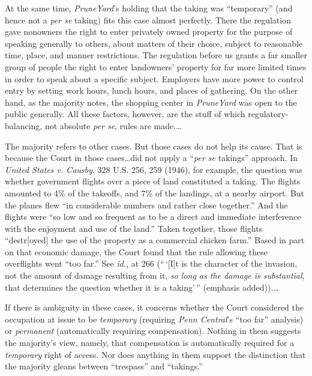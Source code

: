 At the same time, \textit{PruneYard}'s holding that the taking was ``temporary''
(and hence not a \textit{per se} taking) fits this case almost perfectly. There
the regulation gave nonowners the right to enter privately owned property for
the purpose of speaking generally to others, about matters of their choice,
subject to reasonable time, place, and manner restrictions. The regulation
before us grants a far smaller group of people the right to enter landowners'
property for far more limited times in order to speak about a specific subject.
Employers have more power to control entry by setting work hours, lunch hours,
and places of gathering. On the other hand, as the majority notes, the shopping
center in \textit{PruneYard} was open to the public generally. All these
factors, however, are the stuff of which regulatory-balancing, not absolute
\textit{per se}, rules are made.\ldots


The majority refers to other cases. But those cases do not help its cause. That
is because the Court in those cases\ldots did not apply a ``\textit{per se}
takings'' approach. In \textit{United States v. Causby}, 328 U.S. 256, 259
(1946), for example, the question was whether government flights over a piece of
land constituted a taking. The flights amounted to 4\% of the takeoffs, and 7\%
of the landings, at a nearby airport. But the planes flew ``in considerable
numbers and rather close together.'' And the flights were ``so low and so
frequent as to be a direct and immediate interference with the enjoyment and use
of the land.'' Taken together, those flights ``destr[oyed] the use of the
property as a commercial chicken farm.'' Based in part on that economic damage,
the Court found that the rule allowing these overflights went ``too far.'' See
\textit{id.}, at 266 (``\,`[I]t is the character of the invasion, not the amount
of damage resulting from it, \textit{so long as the damage is substantial}, that
determines the question whether it is a taking'\,'' (emphasis added)).\ldots


If there is ambiguity in these cases, it concerns whether the Court considered
the occupation at issue to be \textit{temporary} (requiring \textit{Penn
Central}'s ``too far'' analysis) or \textit{permanent} (automatically requiring
compensation). Nothing in them suggests the majority's view, namely, that
compensation is automatically required for a \textit{temporary} right of access.
Nor does anything in them support the distinction that the majority gleans
between ``trespass'' and ``takings.'' 


